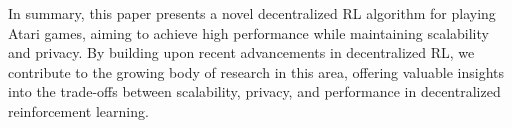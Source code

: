 In summary, this paper presents a novel decentralized RL algorithm for playing Atari games, aiming to achieve high performance while maintaining scalability and privacy. By building upon recent advancements in decentralized RL, we contribute to the growing body of research in this area, offering valuable insights into the trade-offs between scalability, privacy, and performance in decentralized reinforcement learning.